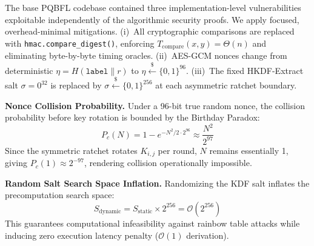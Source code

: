\documentclass[journal, 10pt, twocolumn]{IEEEtran}
\begin{document}
The base PQBFL codebase contained three implementation-level vulnerabilities exploitable independently of the algorithmic security proofs. We apply focused, overhead-minimal mitigations. (i)~All cryptographic comparisons are replaced with \texttt{hmac.compare\_digest()}, enforcing $T_{\text{compare}}(x,y) = \Theta(n)$ and eliminating byte-by-byte timing oracles. (ii)~AES-GCM nonces change from deterministic $\eta = H(\texttt{label}\|r)$ to $\eta \xleftarrow{\$} \{0,1\}^{96}$. (iii)~The fixed HKDF-Extract salt $\sigma = 0^{32}$ is replaced by $\sigma \xleftarrow{\$} \{0,1\}^{256}$ at each asymmetric ratchet boundary.

\textbf{Nonce Collision Probability.} Under a 96-bit true random nonce, the collision probability before key rotation is bounded by the Birthday Paradox:
\begin{equation}
P_c(N) = 1 - e^{-N^2 / 2 \cdot 2^{96}} \approx \frac{N^2}{2^{97}}
\label{eq:nonce_collision}
\end{equation}
Since the symmetric ratchet rotates $K_{i,j}$ per round, $N$ remains essentially 1, giving $P_c(1) \approx 2^{-97}$, rendering collision operationally impossible.

\textbf{Random Salt Search Space Inflation.} Randomizing the KDF salt inflates the precomputation search space:
\begin{equation}
S_{\text{dynamic}} = S_{\text{static}} \times 2^{256} = \mathcal{O}(2^{256})
\label{eq:salt_inflation}
\end{equation}
This guarantees computational infeasibility against rainbow table attacks while inducing zero execution latency penalty ($\mathcal{O}(1)$ derivation).
\end{document}
